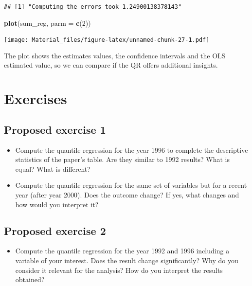 \documentclass[]{book}
\newenvironment{Shaded}{\begin{snugshade}}{\end{snugshade}}
\newcommand{\KeywordTok}[1]{\textcolor[rgb]{0.13,0.29,0.53}{\textbf{#1}}}
\newcommand{\DataTypeTok}[1]{\textcolor[rgb]{0.13,0.29,0.53}{#1}}
\newcommand{\DecValTok}[1]{\textcolor[rgb]{0.00,0.00,0.81}{#1}}
\newcommand{\NormalTok}[1]{#1}
\providecommand{\tightlist}{%
  \setlength{\itemsep}{0pt}\setlength{\parskip}{0pt}}
\begin{document}
\begin{verbatim}
## [1] "Computing the errors took 1.24900138378143"
\end{verbatim}

\begin{Shaded}
\begin{Highlighting}[]
\KeywordTok{plot}\NormalTok{(sum_reg, }\DataTypeTok{parm =} \KeywordTok{c}\NormalTok{(}\DecValTok{2}\NormalTok{))}
\end{Highlighting}
\end{Shaded}

\texttt{[image: Material\_files/figure-latex/unnamed-chunk-27-1.pdf]}

The plot shows the estimates values, the confidence intervals and the
OLS estimated value, so we can compare if the QR offers additional
insights.

\section{Exercises}\label{exercises}

\subsection{Proposed exercise 1}\label{proposed-exercise-1}

\begin{itemize}
\tightlist
\item
  Compute the quantile regression for the year 1996 to complete the
  descriptive statistics of the paper's table. Are they similar to 1992
  results? What is equal? What is different?
\item
  Compute the quantile regression for the same set of variables but for
  a recent year (after year 2000). Does the outcome change? If yes, what
  changes and how would you interpret it?
\end{itemize}

\subsection{Proposed exercise 2}\label{proposed-exercise-2}

\begin{itemize}
\tightlist
\item
  Compute the quantile regression for the year 1992 and 1996 including a
  variable of your interest. Does the result change significantly? Why
  do you consider it relevant for the analysis? How do you interpret the
  results obtained?
\end{itemize}
\end{document}
